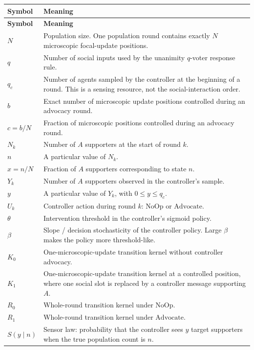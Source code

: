 \documentclass[11pt,a4paper]{article}
\newcommand{\Adv}{\ensuremath{\mathrm{Advocate}}}
\newcommand{\NoOp}{\ensuremath{\mathrm{NoOp}}}
\newcommand{\1}{\mathbbm{1}}
\begin{document}
\begin{longtable}{>{\raggedright\arraybackslash}p{2.0cm}>{\raggedright\arraybackslash}p{11.8cm}}
\toprule
\textbf{Symbol} & \textbf{Meaning} \\
\midrule
\endfirsthead
\toprule
\textbf{Symbol} & \textbf{Meaning} \\
\midrule
\endhead
$N$ & Population size. One population round contains exactly $N$ microscopic focal-update positions. \\
$q$ & Number of social inputs used by the unanimity $q$-voter response rule. \\
$q_c$ & Number of agents sampled by the controller at the beginning of a round. This is a sensing resource, not the social-interaction order. \\
$b$ & Exact number of microscopic update positions controlled during an advocacy round. \\
$c=b/N$ & Fraction of microscopic positions controlled during an advocacy round. \\
$N_k$ & Number of $A$ supporters at the start of round $k$. \\
$n$ & A particular value of $N_k$. \\
$x=n/N$ & Fraction of $A$ supporters corresponding to state $n$. \\
$Y_k$ & Number of $A$ supporters observed in the controller's sample. \\
$y$ & A particular value of $Y_k$, with $0\le y\le q_c$. \\
$U_k$ & Controller action during round $k$: $\NoOp$ or $\Adv$. \\
$\theta$ & Intervention threshold in the controller's sigmoid policy. \\
$\beta$ & Slope / decision stochasticity of the controller policy. Large $\beta$ makes the policy more threshold-like. \\
$K_0$ & One-microscopic-update transition kernel without controller advocacy. \\
$K_1$ & One-microscopic-update transition kernel at a controlled position, where one social slot is replaced by a controller message supporting $A$. \\
$R_0$ & Whole-round transition kernel under $\NoOp$. \\
$R_1$ & Whole-round transition kernel under $\Adv$. \\
$S(y\mid n)$ & Sensor law: probability that the controller sees $y$ target supporters when the true population count is $n$. \\

\end{longtable}
\end{document}
